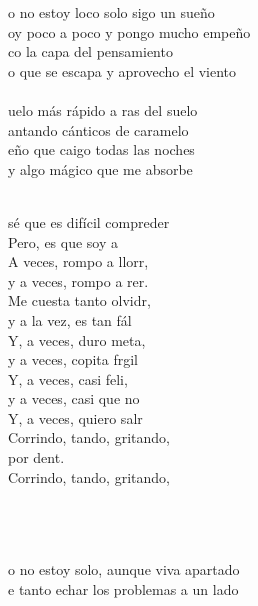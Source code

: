 \begin{cancion}%
	o no estoy loco solo sigo un sueño\\
	oy poco a poco y pongo mucho empeño\\
	co la capa del pensamiento\\
	o que se escapa y aprovecho el viento\\
\jump\\
	uelo más rápido a ras del suelo\\
	antando cánticos de caramelo\\
	eño que caigo todas las noches\\
	y algo mágico que me absorbe\\\jump\\
	\begin{chorus}%
	 sé que es difícil compreder\\
	Pero, es que soy a \\
	A veces, rompo a llorr, \\
	y a veces, rompo a rer. \\
	Me cuesta tanto olvidr, \\
	y a la vez, es tan fál\\
	Y, a veces, duro meta, \\
	y a veces, copita frgil \\
	Y, a veces, casi feli, \\
	y a veces, casi que no\\
	Y, a veces, quiero salr\\
	Corrindo, tando, gritando, \\
	por dent.\\
	Corrindo, tando, gritando,\\
	\end{chorus}%
	\jump\\
\jump\\
	       \\
	o no estoy solo, aunque viva apartado\\
	e tanto echar los problemas a un lado\\

\end{cancion}
